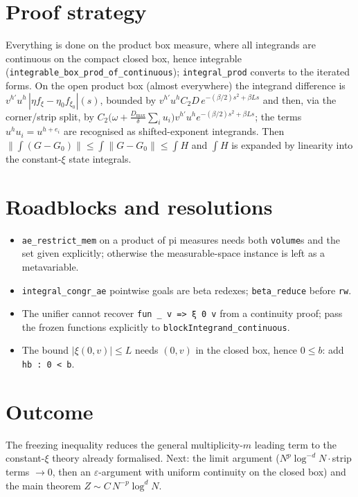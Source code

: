 \documentclass[11pt]{article}
\begin{document}
\section{Proof strategy}
Everything is done on the product box measure, where all integrands are continuous on the compact
closed box, hence integrable (\texttt{integrable\_box\_prod\_of\_continuous}); \texttt{integral\_prod}
converts to the iterated forms. On the open product box (almost everywhere) the integrand difference
is $v^{h'}u^h\,|\eta f_\xi-\eta_0f_{\xi_0}|(s)$, bounded by
$v^{h'}u^hC_2D\,e^{-(\beta/2)s^2+\beta Ls}$ and then, via the corner/strip split, by
$C_2\big(\omega+\tfrac{D_{\max}}{\delta}\sum_iu_i\big)v^{h'}u^he^{-(\beta/2)s^2+\beta Ls}$; the terms
$u^hu_i=u^{h+e_i}$ are recognised as shifted-exponent integrands. Then
$\|\int(G-G_0)\|\le\int\|G-G_0\|\le\int H$ and $\int H$ is expanded by linearity into the constant-$\xi$
state integrals.

\section{Roadblocks and resolutions}
\begin{itemize}
\item \texttt{ae\_restrict\_mem} on a product of pi measures needs both \texttt{volume}s and the set
given explicitly; otherwise the measurable-space instance is left as a metavariable.
\item \texttt{integral\_congr\_ae} pointwise goals are beta redexes; \texttt{beta\_reduce} before
\texttt{rw}.
\item The unifier cannot recover \texttt{fun \_ v => ξ 0 v} from a continuity proof; pass the frozen
functions explicitly to \texttt{blockIntegrand\_continuous}.
\item The bound $|\xi(0,v)|\le L$ needs $(0,v)$ in the closed box, hence $0\le b$: add
\texttt{hb : 0 < b}.
\end{itemize}

\section{Outcome}
The freezing inequality reduces the general multiplicity-$m$ leading term to the constant-$\xi$ theory
already formalised. Next: the limit argument ($N^p\log^{-d}N\cdot$strip terms $\to0$, then an
$\varepsilon$-argument with uniform continuity on the closed box) and the main theorem
$Z\sim C\,N^{-p}\log^dN$.
\end{document}
